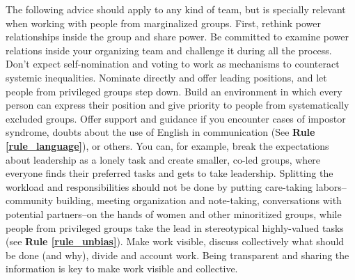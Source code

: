 \documentclass[10pt,letterpaper]{article}
\begin{document}
The following advice should apply to any kind of team, but is specially relevant when working with people from marginalized groups. First, rethink power relationships inside the group and share power. Be committed to examine power relations inside your organizing team and challenge it during all the process. %
Don't expect self-nomination and voting to work as mechanisms to counteract systemic inequalities. Nominate directly and offer leading positions, and let people from privileged groups step down. 
Build an environment in which every person can express their position and give priority to people from systematically excluded groups.
Offer support and guidance if you encounter cases of impostor syndrome, doubts about the use of English in communication (See \textbf{Rule \ref{rule_language}}), or others. You can, for example, break the expectations about leadership as a lonely task and create smaller, co-led groups, where everyone finds their preferred tasks and gets to take leadership. Splitting the workload and responsibilities should not be done by putting care-taking labors--community building, meeting organization and note-taking, conversations with potential partners--on the hands of women and other minoritized groups, while people from privileged groups take the lead in stereotypical highly-valued tasks (see \textbf{Rule \ref{rule_unbias}}). Make work visible, discuss collectively what should be done (and why), divide and account work. Being transparent and sharing the information is key to make work visible and collective. %
\end{document}
